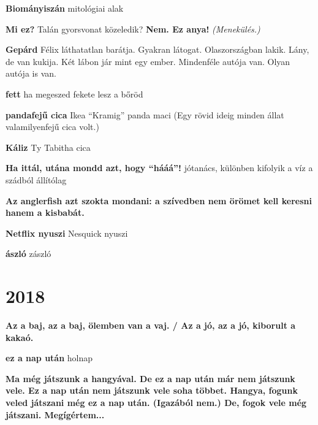 \documentclass[a4paper]{memoir}
\newcommand{\f}[1]{\textbf{#1}} %
\newcommand{\e}{\hangpara{1.5em}{1}} %
\newcommand{\felix}[1]{\e \f{#1} \hspace{1ex}} %
\begin{document}
\felix{Biományiszán} mitológiai alak

\e \f{Mi ez?} Talán gyorsvonat közeledik? \f{Nem. Ez anya!} \textit{(Menekülés.)}

\felix{Gepárd} Félix láthatatlan barátja. Gyakran látogat. Olaszországban lakik. Lány, de van kukija. Két lábon jár mint egy ember. Mindenféle autója van. Olyan autója is van.

\felix{fett} ha megeszed fekete lesz a bőröd

\felix{pandafejű cica} Ikea ``Kramig'' panda maci (Egy rövid ideig minden állat valamilyenfejű cica volt.)

\felix{Káliz} Ty Tabitha cica

\felix{Ha ittál, utána mondd azt, hogy ``hááá''!} jótanács, különben kifolyik a víz a szádból állítólag

\felix{Az anglerfish azt szokta mondani: a szívedben nem örömet kell keresni hanem a kisbabát.}

\felix{Netflix nyuszi} Nesquick nyuszi

\felix{ászló} zászló

\section*{2018}

\felix{Az a baj, az a baj, ölemben van a vaj. / Az a jó, az a jó, kiborult a kakaó.}

\felix{ez a nap után} holnap

\felix{
  Ma még játszunk a hangyával. De ez a nap után már nem játszunk vele.
  Ez a nap után nem játszunk vele soha többet.
  Hangya, fogunk veled játszani még ez a nap után. (Igazából nem.)
  De, fogok vele még játszani. Megígértem...}
\end{document}
